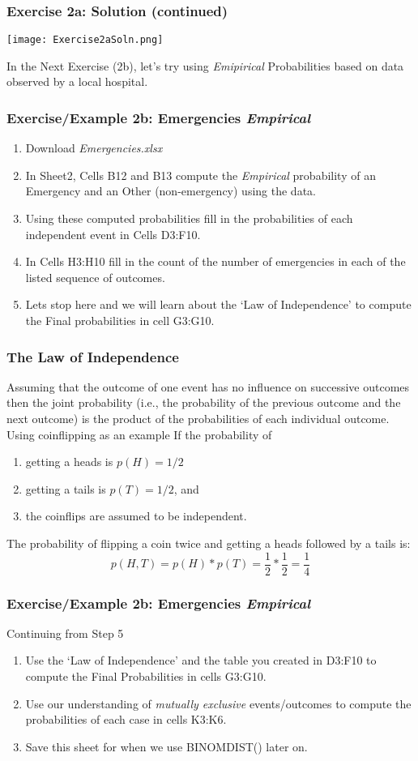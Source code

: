 \documentclass[12pt]{beamer}
\begin{document}
	\begin{frame}
		\frametitle{Exercise 2a: Solution (continued)}
			\begin{center}
				\texttt{[image: Exercise2aSoln.png]}
			\end{center}
		In the Next Exercise (2b), let's try using \textit{Emipirical} Probabilities based on data observed by a local hospital.
	\end{frame}
	\begin{frame}
		\frametitle{Exercise/Example 2b: Emergencies \textit{Empirical}}
		\begin{enumerate}
			\item Download \textit{Emergencies.xlsx}
			\item In Sheet2, Cells B12 and B13 compute the \textit{Empirical} probability of an Emergency and an Other (non-emergency) using the data.
			\item Using these computed probabilities fill in the probabilities of each independent event in Cells D3:F10.
			\item In Cells H3:H10 fill in the count of the number of emergencies in each of the listed sequence of outcomes. 
			\item Lets stop here and we will learn about the `Law of Independence' to compute the Final probabilities in cell G3:G10. 
		\end{enumerate}
	\end{frame}
	\begin{frame}
		\frametitle{The Law of Independence}
		Assuming that the outcome of one event has no influence on successive outcomes then the joint probability (i.e., the probability of the previous outcome and the next outcome) is the product of the probabilities of each individual outcome.\\ Using coinflipping as an example
		If the probability of
		\begin{enumerate}
			\item getting a heads is $p(H)=1/2$
			\item getting a tails is $p(T)=1/2$, and 
			\item the coinflips are assumed to be independent. 
		\end{enumerate}
		The probability of flipping a coin twice and getting a heads followed by a tails is:
		$$ p(H,T) = p(H)*p(T) = \frac{1}{2} * \frac{1}{2}= \frac{1}{4} $$ 
	
	\end{frame}
	\begin{frame}
		\frametitle{Exercise/Example 2b: Emergencies \textit{Empirical}}
		Continuing from Step 5 
		\begin{enumerate}
			\item Use the `Law of Independence' and the table you created in D3:F10 to compute the Final Probabilities in cells G3:G10.
			\item Use our understanding of \textit{mutually exclusive} events/outcomes to compute the probabilities of each case in cells K3:K6.
			\item Save this sheet for when we use BINOMDIST() later on.
		\end{enumerate}
	\end{frame}
\end{document}
